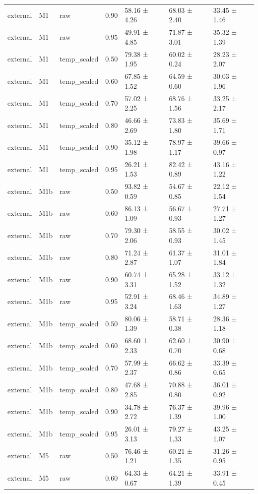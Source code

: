 \begin{tabular}{lllrlll}
external & M1 & raw & 0.90 & 58.16 ± 4.26 & 68.03 ± 2.40 & 33.45 ± 1.46 \\
external & M1 & raw & 0.95 & 49.91 ± 4.85 & 71.87 ± 3.01 & 35.32 ± 1.39 \\
external & M1 & temp\_scaled & 0.50 & 79.38 ± 1.95 & 60.02 ± 0.24 & 28.23 ± 2.07 \\
external & M1 & temp\_scaled & 0.60 & 67.85 ± 1.52 & 64.59 ± 0.60 & 30.03 ± 1.96 \\
external & M1 & temp\_scaled & 0.70 & 57.02 ± 2.25 & 68.76 ± 1.56 & 33.25 ± 2.17 \\
external & M1 & temp\_scaled & 0.80 & 46.66 ± 2.69 & 73.83 ± 1.80 & 35.69 ± 1.71 \\
external & M1 & temp\_scaled & 0.90 & 35.12 ± 1.98 & 78.97 ± 1.17 & 39.66 ± 0.97 \\
external & M1 & temp\_scaled & 0.95 & 26.21 ± 1.53 & 82.42 ± 0.89 & 43.16 ± 1.22 \\
external & M1b & raw & 0.50 & 93.82 ± 0.59 & 54.67 ± 0.85 & 22.12 ± 1.54 \\
external & M1b & raw & 0.60 & 86.13 ± 1.09 & 56.67 ± 0.93 & 27.71 ± 1.27 \\
external & M1b & raw & 0.70 & 79.30 ± 2.06 & 58.55 ± 0.93 & 30.02 ± 1.45 \\
external & M1b & raw & 0.80 & 71.24 ± 2.87 & 61.37 ± 1.07 & 31.01 ± 1.84 \\
external & M1b & raw & 0.90 & 60.74 ± 3.31 & 65.28 ± 1.52 & 33.12 ± 1.32 \\
external & M1b & raw & 0.95 & 52.91 ± 3.24 & 68.46 ± 1.63 & 34.89 ± 1.27 \\
external & M1b & temp\_scaled & 0.50 & 80.06 ± 1.39 & 58.71 ± 0.38 & 28.36 ± 1.18 \\
external & M1b & temp\_scaled & 0.60 & 68.60 ± 2.33 & 62.60 ± 0.70 & 30.90 ± 0.68 \\
external & M1b & temp\_scaled & 0.70 & 57.99 ± 2.37 & 66.62 ± 0.86 & 33.39 ± 0.65 \\
external & M1b & temp\_scaled & 0.80 & 47.68 ± 2.85 & 70.88 ± 0.80 & 36.01 ± 0.92 \\
external & M1b & temp\_scaled & 0.90 & 34.78 ± 2.72 & 76.37 ± 1.39 & 39.96 ± 1.00 \\
external & M1b & temp\_scaled & 0.95 & 26.01 ± 3.13 & 79.27 ± 1.33 & 43.25 ± 1.07 \\
external & M5 & raw & 0.50 & 76.46 ± 1.21 & 60.21 ± 1.35 & 31.26 ± 0.95 \\
external & M5 & raw & 0.60 & 64.33 ± 0.67 & 64.21 ± 1.39 & 33.91 ± 0.45 \\

\end{tabular}
